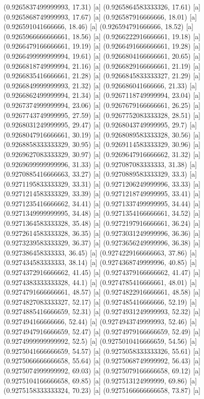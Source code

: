 {{{(0.9265837499999993, 17.31) [a] 
(0.9265864583333326, 17.61) [a] 
(0.9265868749999993, 17.67) [a] 
(0.926587916666666, 18.01) [a] 
(0.926591041666666, 18.46) [a] 
(0.926594791666666, 18.52) [a] 
(0.9265966666666661, 18.56) [a] 
(0.9266222916666661, 19.18) [a] 
(0.9266479166666661, 19.19) [a] 
(0.9266491666666661, 19.28) [a] 
(0.9266499999999994, 19.61) [a] 
(0.9266804166666661, 20.65) [a] 
(0.9266818749999994, 21.16) [a] 
(0.9266829166666661, 21.19) [a] 
(0.9266835416666661, 21.28) [a] 
(0.9266845833333327, 21.29) [a] 
(0.9266849999999993, 21.32) [a] 
(0.926686041666666, 21.33) [a] 
(0.9266862499999994, 21.34) [a] 
(0.9267118749999994, 23.04) [a] 
(0.9267374999999994, 23.06) [a] 
(0.9267679166666661, 26.25) [a] 
(0.9267743749999995, 27.59) [a] 
(0.9267752083333328, 28.51) [a] 
(0.9268031249999995, 29.47) [a] 
(0.9268043749999995, 29.7) [a] 
(0.9268047916666661, 30.19) [a] 
(0.9268089583333328, 30.56) [a] 
(0.9268858333333329, 30.95) [a] 
(0.9269114583333329, 30.96) [a] 
(0.9269627083333329, 30.97) [a] 
(0.9269647916666662, 31.32) [a] 
(0.9269699999999996, 31.33) [a] 
(0.927087083333333, 31.38) [a] 
(0.9270885416666663, 33.27) [a] 
(0.9270889583333329, 33.3) [a] 
(0.9271195833333329, 33.31) [a] 
(0.9271206249999996, 33.33) [a] 
(0.9271214583333329, 33.39) [a] 
(0.9271218749999995, 33.41) [a] 
(0.9271235416666662, 34.41) [a] 
(0.9271337499999995, 34.44) [a] 
(0.9271349999999995, 34.48) [a] 
(0.9271354166666661, 34.52) [a] 
(0.9271364583333328, 35.48) [a] 
(0.9272197916666661, 36.24) [a] 
(0.9272614583333328, 36.35) [a] 
(0.9273031249999996, 36.36) [a] 
(0.9273239583333329, 36.37) [a] 
(0.9273656249999996, 36.38) [a] 
(0.927386458333333, 36.45) [a] 
(0.9274229166666663, 37.86) [a] 
(0.927434583333333, 38.14) [a] 
(0.9274368749999996, 40.85) [a] 
(0.9274372916666662, 41.45) [a] 
(0.9274379166666662, 41.47) [a] 
(0.9274383333333328, 44.1) [a] 
(0.9274785416666661, 48.01) [a] 
(0.9274791666666661, 48.57) [a] 
(0.9274822916666661, 48.58) [a] 
(0.9274827083333327, 52.17) [a] 
(0.927485416666666, 52.19) [a] 
(0.9274885416666659, 52.31) [a] 
(0.9274931249999993, 52.32) [a] 
(0.927494166666666, 52.44) [a] 
(0.9274943749999993, 52.46) [a] 
(0.9274947916666659, 52.47) [a] 
(0.9274979166666659, 52.49) [a] 
(0.9274999999999992, 52.5) [a] 
(0.9275010416666659, 54.56) [a] 
(0.9275041666666659, 54.57) [a] 
(0.9275058333333326, 55.61) [a] 
(0.9275066666666658, 55.64) [a] 
(0.9275068749999992, 56.43) [a] 
(0.9275074999999992, 69.03) [a] 
(0.9275079166666658, 69.12) [a] 
(0.9275104166666658, 69.85) [a] 
(0.927513124999999, 69.86) [a] 
(0.9275158333333324, 70.23) [a] 
(0.9275166666666658, 73.87) [a] 
}}}
